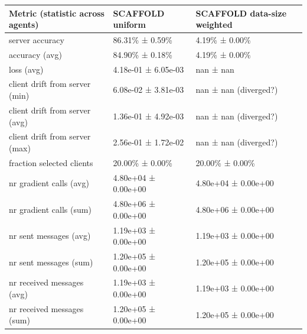\begin{tabular}{lll}
\hline
 Metric (statistic across agents)   & SCAFFOLD uniform    & SCAFFOLD data-size weighted   \\
\hline
 server accuracy                    & 86.31\% ± 0.59\%      & 4.19\% ± 0.00\%                 \\
 accuracy (avg)                     & 84.90\% ± 0.18\%      & 4.19\% ± 0.00\%                 \\
 loss (avg)                         & 4.18e-01 ± 6.05e-03 & nan ± nan                     \\
 client drift from server (min)     & 6.08e-02 ± 3.81e-03 & nan ± nan (diverged?)         \\
 client drift from server (avg)     & 1.36e-01 ± 4.92e-03 & nan ± nan (diverged?)         \\
 client drift from server (max)     & 2.56e-01 ± 1.72e-02 & nan ± nan (diverged?)         \\
 fraction selected clients          & 20.00\% ± 0.00\%      & 20.00\% ± 0.00\%                \\
 nr gradient calls (avg)            & 4.80e+04 ± 0.00e+00 & 4.80e+04 ± 0.00e+00           \\
 nr gradient calls (sum)            & 4.80e+06 ± 0.00e+00 & 4.80e+06 ± 0.00e+00           \\
 nr sent messages (avg)             & 1.19e+03 ± 0.00e+00 & 1.19e+03 ± 0.00e+00           \\
 nr sent messages (sum)             & 1.20e+05 ± 0.00e+00 & 1.20e+05 ± 0.00e+00           \\
 nr received messages (avg)         & 1.19e+03 ± 0.00e+00 & 1.19e+03 ± 0.00e+00           \\
 nr received messages (sum)         & 1.20e+05 ± 0.00e+00 & 1.20e+05 ± 0.00e+00           \\
\hline
\end{tabular}